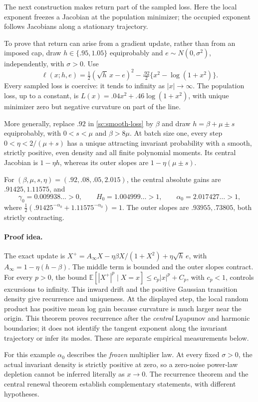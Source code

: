 
The next construction makes return part of the sampled loss. Here the local exponent freezes a Jacobian at the population minimizer; the occupied exponent follows Jacobians along a stationary trajectory.

To prove that return can arise from a gradient update, rather than from
an imposed cap, draw \(h\in\{.95,1.05\}\) equiprobably and
\(e\sim N(0,\sigma^2)\), independently, with \(\sigma>0\). Use
\begin{equation}
 \ell(x;h,e)=\tfrac12(\sqrt h\,x-e)^2
 -\tfrac{.92}{2}\{x^2-\log(1+x^2)\}.
 \label{sc:smooth-loss}
\end{equation}
Every sampled loss is coercive: it tends to infinity as $|x|\to\infty$. The population loss, up to a constant, is
\(L(x)=.04x^2+.46\log(1+x^2)\), with unique minimizer zero but negative
curvature on part of the line.

\begin{theorem}
\label{sc:nonlinear-recurrence}
More generally, replace \(.92\) in \eqref{sc:smooth-loss} by \(\beta\)
and draw \(h=\beta+\mu\pm s\) equiprobably, with
\(0<s<\mu\) and \(\beta>8\mu\). At batch size one, every step
\(0<\eta<2/(\mu+s)\) has a unique attracting invariant probability
with a smooth, strictly positive, even density and all finite polynomial
moments. Its central Jacobian is \(1-\eta h\), whereas its outer slopes
are \(1-\eta(\mu\pm s)\).

For \((\beta,\mu,s,\eta)=(.92,.08,.05,2.015)\), the central absolute
gains are \(.91425,1.11575\), and
\begin{equation}
 \gamma_0=0.009938\ldots>0,\qquad
 H_0=1.004999\ldots>1,\qquad \alpha_0=2.017427\ldots>1,
 \label{sc:concrete-numbers}
\end{equation}
where \(\tfrac12(.91425^{-\alpha_0}+1.11575^{-\alpha_0})=1\).
The outer slopes are \(.93955,.73805\), both strictly contracting.
\end{theorem}

\paragraph{Proof idea.}
The exact update is
\(X^+=A_\infty X-\eta\beta X/(1+X^2)+\eta\sqrt h\,e\), with
\(A_\infty=1-\eta(h-\beta)\). The middle term is bounded and the outer
slopes contract. For every $p>0$, the bound $\mathbb E[|X^+|^p\mid X=x]\le c_p|x|^p+C_p$, with $c_p<1$, controls excursions to infinity. This inward drift and the positive Gaussian transition density give recurrence and uniqueness. At the displayed step, the local random product has positive mean log gain because curvature is much larger near the origin. This theorem proves recurrence after the \emph{central} Lyapunov
and harmonic boundaries; it does not identify the tangent exponent along
the invariant trajectory or infer its modes. These are separate empirical
measurements below.

For this example $\alpha_0$ describes the \emph{frozen} multiplier law. At every fixed $\sigma>0$, the actual invariant density is strictly positive at zero, so a zero-noise power-law depletion cannot be inferred literally as $x\to0$. The recurrence theorem and the central renewal theorem establish complementary statements, with different hypotheses.
